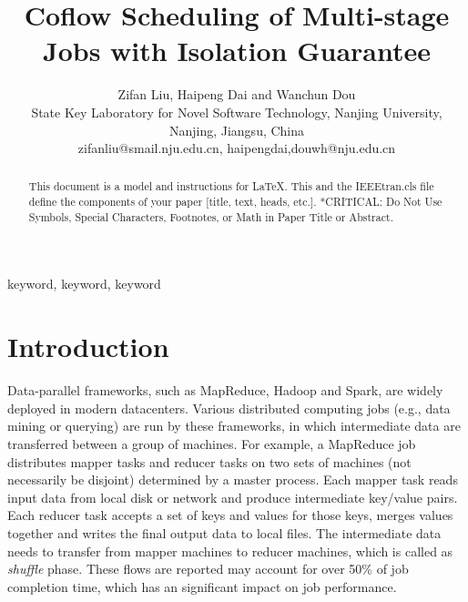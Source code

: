 \documentclass[10pt, conference, letterpaper]{IEEEtran}
\begin{document}
\title{Coflow Scheduling of Multi-stage Jobs with Isolation Guarantee}

\author{Zifan Liu, Haipeng Dai and Wanchun Dou\\
State Key Laboratory for Novel Software Technology, Nanjing University, Nanjing, Jiangsu, China\\
zifanliu@smail.nju.edu.cn, haipengdai,douwh@nju.edu.cn}

\maketitle

\begin{abstract}
This document is a model and instructions for \LaTeX.
This and the IEEEtran.cls file define the components of your paper [title, text, heads, etc.]. *CRITICAL: Do Not Use Symbols, Special Characters, Footnotes,
or Math in Paper Title or Abstract.
\end{abstract}

\begin{IEEEkeywords}
keyword, keyword, keyword
\end{IEEEkeywords}

\section{Introduction}
Data-parallel frameworks, such as MapReduce\cite{MapReduce}, Hadoop\cite{Hadoop} and Spark\cite{Spark}, are widely deployed in modern datacenters. Various distributed computing jobs (e.g., data mining or querying) are run by these frameworks, in which intermediate data are transferred between a group of machines. For example, a MapReduce job distributes mapper tasks and reducer tasks on two sets of machines (not necessarily be disjoint) determined by a master process. Each mapper task reads input data from local disk or network and produce intermediate key/value pairs. Each reducer task accepts a set of keys and values for those keys, merges values together and writes the final output data to local files. The intermediate data needs to transfer from mapper machines to reducer machines, which is called as \emph{shuffle} phase. These flows are reported may account for over 50\% of job completion time, which has an significant impact on job performance.
\end{document}
